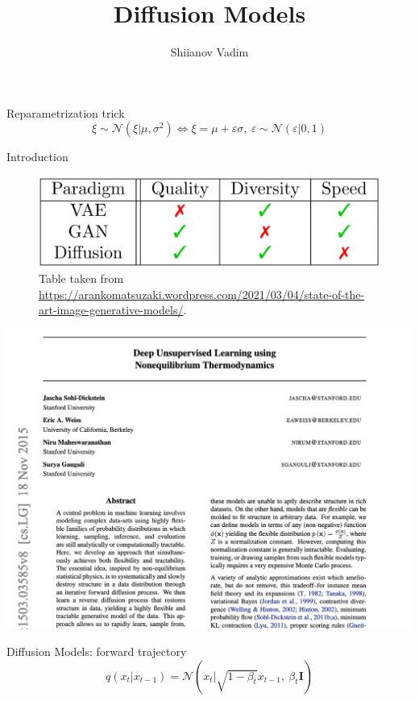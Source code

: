 \documentclass{beamer}
\title{Diffusion Models}
\author{Shiianov Vadim}
\begin{document}
\begin{frame}
    \titlepage
\end{frame}

\begin{frame}{Reparametrization trick}
    $$ \xi \sim \mathcal{N}(\xi|\mu, \sigma^2) \Leftrightarrow \xi = \mu + \varepsilon \sigma,\ \varepsilon \sim \mathcal{N}(\varepsilon|0, 1) $$
\end{frame}

\begin{frame}{Introduction}
    \begin{figure}
        \includegraphics[width=\textwidth]{../images/2022-03-17-diffusion_models_files/intro.png}
        \caption{Table taken from \url{https://arankomatsuzaki.wordpress.com/2021/03/04/state-of-the-art-image-generative-models/}.}
    \end{figure}
\end{frame}

\begin{frame}
    \includegraphics[width=\textwidth]{../images/2022-03-17-diffusion_models_files/dm_paper.png}
\end{frame}

\begin{frame}[t]{Diffusion Models: forward trajectory \cite{sohldickstein2015deep}}
    $$ q(x_t | x_{t-1}) = \mathcal{N}(x_t|\sqrt{1 - \beta_t} x_{t-1},\ \beta_t \mathbf{I}) $$
\end{frame}
\end{document}
